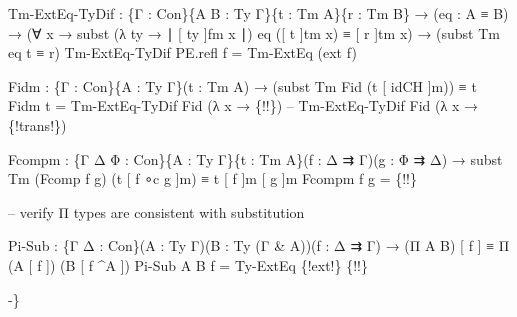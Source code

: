 \begin{code}
{  Tm-ExtEq-TyDif : \{Γ : Con\}\{A B : Ty Γ\}\{t : Tm A\}\{r : Tm B\} → (eq : A ≡ B) → 
                   (∀ x → subst (λ ty → ∣ [ ty ]fm x ∣) eq ([ t ]tm x) ≡ [ r ]tm x) → 
                   (subst Tm eq t ≡ r)
  Tm-ExtEq-TyDif PE.refl f = Tm-ExtEq (ext f)


  Fidm : \{Γ : Con\}\{A : Ty Γ\}(t : Tm A) → (subst Tm Fid (t [ idCH ]m)) ≡ t
  Fidm t = Tm-ExtEq-TyDif Fid (λ x → \{!!\}) -- Tm-ExtEq-TyDif Fid (λ x → \{!trans!\})

  Fcompm : \{Γ Δ Φ : Con\}\{A : Ty Γ\}\{t : Tm A\}(f : Δ ⇉ Γ)(g : Φ ⇉ Δ) → subst Tm (Fcomp f g) (t [ f ∘c g ]m) ≡ t [ f ]m [ g ]m
  Fcompm f g = \{!!\} 
 
-- verify Π types are consistent with substitution

  Pi-Sub : \{Γ Δ : Con\}(A : Ty Γ)(B : Ty (Γ \& A))(f : Δ ⇉ Γ) →
          (Π A B) [ f ] ≡ Π (A [ f ]) (B [ f \textasciicircum A ])
  Pi-Sub A B f = Ty-ExtEq \{!ext!\} \{!!\}

-\}}\<%
\\
%
\\
\>\<\end{code}
